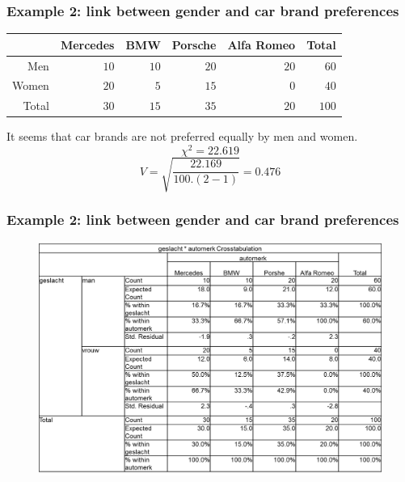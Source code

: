 \documentclass{beamer}
\begin{document}
\begin{frame}
  \frametitle{Example 2: link between gender and car brand preferences}
  \begin{table}[h] \centering
    \begin{tabular}{@{}rrrrrr@{}}
    	\toprule
    	      & Mercedes &  BMW & Porsche & Alfa Romeo & Total \\ \midrule
    	  Men &     $10$ & $10$ &    $20$ &       $20$ &  $60$ \\
    	Women &     $20$ &  $5$ &    $15$ &        $0$ &  $40$ \\
    	Total &     $30$ & $15$ &    $35$ &       $20$ & $100$ \\ \bottomrule
    \end{tabular}
  \end{table}

  It seems that car brands are not preferred equally by men and women.
  \[ \chi^{2} = 22.619 \]
  \[ V = \sqrt{\frac{22.169}{100 . (2-1)}}  = 0.476\]
\end{frame}

\begin{frame}
  \frametitle{Example 2: link between gender and car brand preferences}

  \begin{figure}
    \centering
    \includegraphics[width=1.00\textwidth]{img/les3-spssCars.png}
    \label{fig:les3-spssCars}
  \end{figure}

\end{frame}
\end{document}
